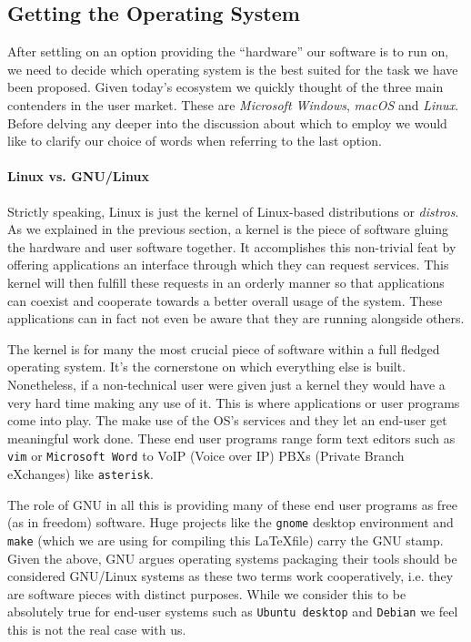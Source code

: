         \subsection{Getting the Operating System}
            After settling on an option providing the ``hardware'' our software is to run on, we need to decide which operating system is the best suited for the task we have been proposed. Given today's ecosystem we quickly thought of the three main contenders in the user market. These are \textit{Microsoft Windows}, \textit{macOS} and \textit{Linux}. Before delving any deeper into the discussion about which to employ we would like to clarify our choice of words when referring to the last option.\\

            \paragraph{Linux vs. GNU/Linux}
                Strictly speaking, Linux is just the kernel of Linux-based distributions or \textit{distros}. As we explained in the previous section, a kernel is the piece of software gluing the hardware and user software together. It accomplishes this non-trivial feat by offering applications an interface through which they can request services. This kernel will then fulfill these requests in an orderly manner so that applications can coexist and cooperate towards a better overall usage of the system. These applications can in fact not even be aware that they are running alongside others.

                The kernel is for many the most crucial piece of software within a full fledged operating system. It's the cornerstone on which everything else is built. Nonetheless, if a non-technical user were given just a kernel they would have a very hard time making any use of it. This is where applications or user programs come into play. The make use of the OS's services and they let an end-user get meaningful work done. These end user programs range form text editors such as \texttt{vim} or \texttt{Microsoft Word} to VoIP (Voice over IP) PBXs (Private Branch eXchanges) like \texttt{asterisk}.

                The role of GNU in all this is providing many of these end user programs as free (as in freedom) software. Huge projects like the \texttt{gnome} desktop environment and \texttt{make} (which we are using for compiling this \LaTeX file) carry the GNU stamp. Given the above, GNU argues operating systems packaging their tools should be considered GNU/Linux systems as these two terms work cooperatively, i.e. they are software pieces with distinct purposes. While we consider this to be absolutely true for end-user systems such as \texttt{Ubuntu desktop} and \texttt{Debian} we feel this is not the real case with us.

